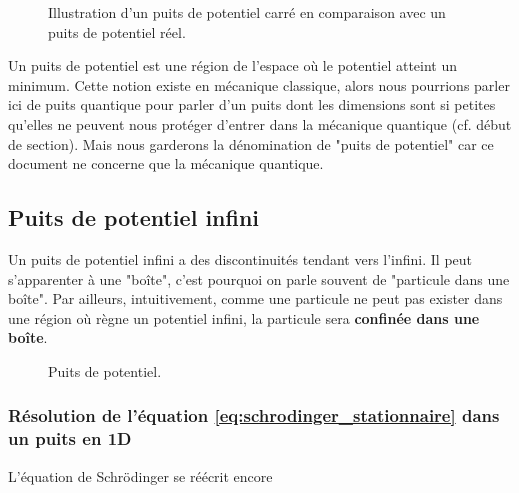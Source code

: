 \documentclass[12pt, a4paper]{book}
\begin{document}
\begin{figure}[h]
\centering
\scalebox{1}{}
\caption{Illustration d'un puits de potentiel carré en comparaison avec un puits de potentiel réel.}
\label{fig:potentiel_carre}
\end{figure}

Un puits de potentiel est une région de l'espace où le potentiel atteint un minimum. Cette notion existe en mécanique classique, alors nous pourrions parler ici de puits quantique pour parler d'un puits dont les dimensions sont si petites qu'elles ne peuvent nous protéger d'entrer dans la mécanique quantique (cf. début de section). Mais nous garderons la dénomination de "puits de potentiel" car ce document ne concerne que la mécanique quantique. \\


\subsection{Puits de potentiel infini}
Un puits de potentiel infini a des discontinuités tendant vers l'infini. Il peut s'apparenter à une "boîte", c'est pourquoi on parle souvent de "particule dans une boîte". Par ailleurs, intuitivement, comme une particule ne peut pas exister dans une région où règne un potentiel infini, la particule sera \textbf{confinée dans une boîte}.
\begin{figure}[h]
\centering
\scalebox{1}{}
\caption{Puits de potentiel.}
\label{fig:puits_potentiel}
\end{figure}
\subsubsection{Résolution de l'équation \eqref{eq:schrodinger_stationnaire} dans un puits en 1D}
L'équation de Schrödinger se réécrit encore 
\end{document}
